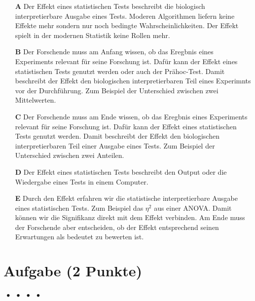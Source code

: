 \documentclass[a4paper, 9pt]{scrartcl}\usepackage[]{graphicx}\usepackage[]{xcolor}
\begin{document}
\begin{enumerate}
\item [\textbf{A} \msquare] Der Effekt eines statistischen Tests beschreibt die biologisch interpretierbare Ausgabe eines Tests. Moderen Algorithmen liefern keine Effekte mehr sondern nur noch bedingte Wahrscheinlichkeiten. Der Effekt spielt in der modernen Statistik keine Rollen mehr.
\item [\textbf{B} \msquare] Der Forschende muss am Anfang wissen, ob das Eregbnis eines Experiments relevant für seine Forschung ist. Dafür kann der Effekt eines statistischen Tests genutzt werden oder auch der Prähoc-Test. Damit beschreibt der Effekt den biologischen interpretierbaren Teil eines Experimnts vor der Durchführung. Zum Beispiel der Unterschied zwischen zwei Mittelwerten.
\item [\textbf{C} \msquare] Der Forschende muss am Ende wissen, ob das Eregbnis eines Experiments relevant für seine Forschung ist. Dafür kann der Effekt eines statistischen Tests genutzt werden. Damit beschreibt der Effekt den biologischen interpretierbaren Teil einer Ausgabe eines Tests. Zum Beispiel der Unterschied zwischen zwei Anteilen.
\item [\textbf{D} \msquare] Der Effekt eines statistischen Tests beschreibt den Output oder die Wiedergabe eines Tests in einem Computer.
\item [\textbf{E} \msquare] Durch den Effekt erfahren wir die statistische interpretierbare Ausgabe eines statistischen Tests. Zum Beispiel das $\eta^2$ aus einer ANOVA. Damit können wir die Signifikanz direkt mit dem Effekt verbinden. Am Ende muss der Forschende aber entscheiden, ob der Effekt entsprechend seinen Erwartungen als bedeutet zu bewerten ist.
\end{enumerate}

\section{Aufgabe \hfill (2 Punkte)}

\ifcollection
\begin{flushright}
\tiny\vspace{-2Ex}
\textbf{\examinhaltstart}
\exammodulemathstat $\;\bullet$
\exammodulestat $\;\bullet$
\exammodulestatbbv $\;\bullet$
\exammodulestatversuch $\;\bullet$
\exammodulebiostat
\vspace{-1Ex}
\end{flushright}
\fi
\end{document}
